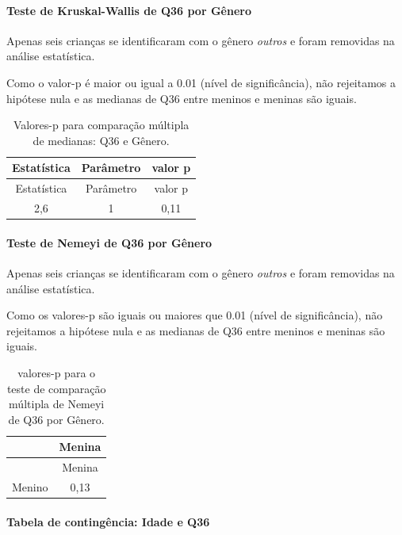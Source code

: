 \documentclass[]{article}
\let\oldparagraph\paragraph
\renewcommand{\paragraph}[1]{\oldparagraph{#1}\mbox{}}
\begin{document}
\hypertarget{teste-de-kruskal-wallis-de-q36-por-guxeanero}{%
\paragraph{Teste de Kruskal-Wallis de Q36 por Gênero}\label{teste-de-kruskal-wallis-de-q36-por-guxeanero}}

Apenas seis crianças se identificaram com o gênero \emph{outros} e foram removidas na análise estatística.

Como o valor-p é maior ou igual a 0.01 (nível de significância), não rejeitamos a hipótese nula e as medianas de Q36 entre meninos e meninas são iguais.

\begin{longtable}[]{@{}ccc@{}}
\caption{\label{tab:unnamed-chunk-1328}Valores-p para comparação múltipla de medianas: Q36 e Gênero.}\tabularnewline
\toprule
Estatística & Parâmetro & valor p\tabularnewline
\midrule
\endfirsthead
\toprule
Estatística & Parâmetro & valor p\tabularnewline
\midrule
\endhead
2,6 & 1 & 0,11\tabularnewline
\bottomrule
\end{longtable}

\hypertarget{teste-de-nemeyi-de-q36-por-guxeanero}{%
\paragraph{Teste de Nemeyi de Q36 por Gênero}\label{teste-de-nemeyi-de-q36-por-guxeanero}}

Apenas seis crianças se identificaram com o gênero \emph{outros} e foram removidas na análise estatística.

Como os valores-p são iguais ou maiores que 0.01 (nível de significância), não rejeitamos a hipótese nula e as medianas de Q36 entre meninos e meninas são iguais.

\begin{longtable}[]{@{}lc@{}}
\caption{\label{tab:unnamed-chunk-1330}valores-p para o teste de comparação múltipla de Nemeyi de Q36 por Gênero.}\tabularnewline
\toprule
& Menina\tabularnewline
\midrule
\endfirsthead
\toprule
& Menina\tabularnewline
\midrule
\endhead
Menino & 0,13\tabularnewline
\bottomrule
\end{longtable}

\cleardoublepage

\hypertarget{tabela-de-continguxeancia-idade-e-q36}{%
\paragraph{Tabela de contingência: Idade e Q36}\label{tabela-de-continguxeancia-idade-e-q36}}
\end{document}
